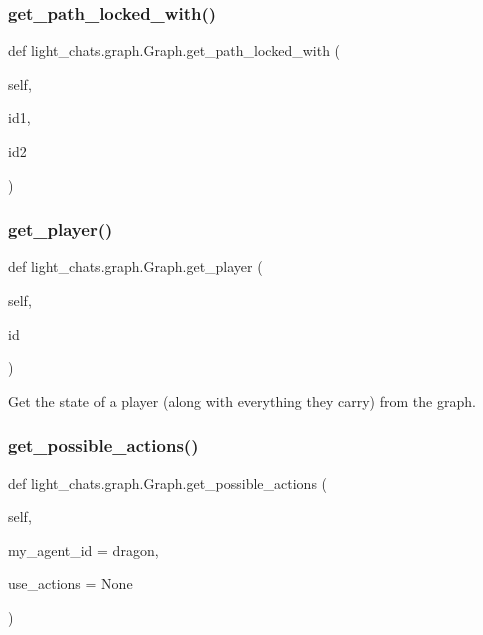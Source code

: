 \subsubsection{\texorpdfstring{get\+\_\+path\+\_\+locked\+\_\+with()}{get\_path\_locked\_with()}}
{\footnotesize\ttfamily def light\+\_\+chats.\+graph.\+Graph.\+get\+\_\+path\+\_\+locked\+\_\+with (\begin{DoxyParamCaption}\item[{}]{self,  }\item[{}]{id1,  }\item[{}]{id2 }\end{DoxyParamCaption})}

\mbox{\label{classlight__chats_1_1graph_1_1Graph_a7f86299224bed2c821ed4ffa853cd669}} 
\subsubsection{\texorpdfstring{get\+\_\+player()}{get\_player()}}
{\footnotesize\ttfamily def light\+\_\+chats.\+graph.\+Graph.\+get\+\_\+player (\begin{DoxyParamCaption}\item[{}]{self,  }\item[{}]{id }\end{DoxyParamCaption})}

\begin{DoxyVerb}Get the state of a player (along with everything they carry) from the graph.
\end{DoxyVerb}
 \mbox{\label{classlight__chats_1_1graph_1_1Graph_a40e6753f63c9c8d31dd57a5c38aaac3c}} 
\subsubsection{\texorpdfstring{get\+\_\+possible\+\_\+actions()}{get\_possible\_actions()}}
{\footnotesize\ttfamily def light\+\_\+chats.\+graph.\+Graph.\+get\+\_\+possible\+\_\+actions (\begin{DoxyParamCaption}\item[{}]{self,  }\item[{}]{my\+\_\+agent\+\_\+id = {\ttfamily \textquotesingle{}dragon\textquotesingle{}},  }\item[{}]{use\+\_\+actions = {\ttfamily None} }\end{DoxyParamCaption})}

